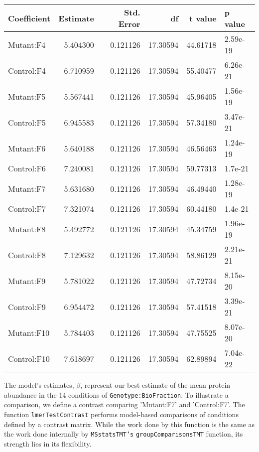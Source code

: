 \documentclass[11pt]{elife}\usepackage[]{graphicx}\usepackage[]{color}
\newenvironment{knitrout}{}{} %
\begin{document}
\begin{knitrout}
\color{fgcolor}
\begin{tabular}{l|r|r|r|r|l}
\hline
Coefficient & Estimate & Std. Error & df & t value & p value\\
\hline
Mutant:F4 & 5.404300 & 0.121126 & 17.30594 & 44.61718 & 2.59e-19\\
\hline
Control:F4 & 6.710959 & 0.121126 & 17.30594 & 55.40477 & 6.26e-21\\
\hline
Mutant:F5 & 5.567441 & 0.121126 & 17.30594 & 45.96405 & 1.56e-19\\
\hline
Control:F5 & 6.945583 & 0.121126 & 17.30594 & 57.34180 & 3.47e-21\\
\hline
Mutant:F6 & 5.640188 & 0.121126 & 17.30594 & 46.56463 & 1.24e-19\\
\hline
Control:F6 & 7.240081 & 0.121126 & 17.30594 & 59.77313 & 1.7e-21\\
\hline
Mutant:F7 & 5.631680 & 0.121126 & 17.30594 & 46.49440 & 1.28e-19\\
\hline
Control:F7 & 7.321074 & 0.121126 & 17.30594 & 60.44180 & 1.4e-21\\
\hline
Mutant:F8 & 5.492772 & 0.121126 & 17.30594 & 45.34759 & 1.96e-19\\
\hline
Control:F8 & 7.129632 & 0.121126 & 17.30594 & 58.86129 & 2.21e-21\\
\hline
Mutant:F9 & 5.781022 & 0.121126 & 17.30594 & 47.72734 & 8.15e-20\\
\hline
Control:F9 & 6.954472 & 0.121126 & 17.30594 & 57.41518 & 3.39e-21\\
\hline
Mutant:F10 & 5.784403 & 0.121126 & 17.30594 & 47.75525 & 8.07e-20\\
\hline
Control:F10 & 7.618697 & 0.121126 & 17.30594 & 62.89894 & 7.04e-22\\
\hline
\end{tabular}


\end{knitrout}


The model's estimates, $\beta$, represent our best estimate of the mean protein
abundance in the 14 conditions of \texttt{Genotype:BioFraction}. To illustrate a
comparison, we define a contrast comparing 'Mutant:F7' and 'Control:F7'.
The function  \texttt{lmerTestContrast} performs model-based comparisons of
conditions defined by a contrast matrix. While the work done by this function 
is the same as the work done internally by \texttt{MSstatsTMT's}
\texttt{groupComparisonsTMT} function, its strength lies in its flexibility.\\
\end{document}
